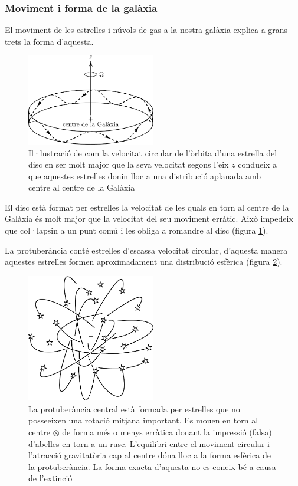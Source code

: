 \subsubsection*{Moviment i forma de la galàxia}
El moviment de les estrelles i núvols de gas a la nostra galàxia explica a grans trets la forma d'aquesta.
\begin{figure}[H]
	\centering
	\includegraphics[width=0.5\textwidth]{./images/6-vel-disc}
	\caption{Il·lustració de com la velocitat circular de l'òrbita d'una estrella del disc en ser molt major que la seva velocitat segons l'eix $z$ condueix a que aquestes estrelles donin lloc a una distribució aplanada amb centre al centre de la Galàxia}
	\label{fig:vel-disc}
\end{figure}

El disc està format per estrelles la velocitat de les quals en torn al centre de la Galàxia és molt major que la velocitat del seu moviment erràtic. Això impedeix que col·lapsin a un punt comú i les obliga a romandre al disc (figura \ref{fig:vel-disc}).

La protuberància conté estrelles d'escassa velocitat circular, d'aquesta manera aquestes estrelles formen aproximadament una distribució esfèrica (figura \ref{fig:milky-protuberance}).
\begin{figure}[H]
	\centering
	\includegraphics[width=0.5\textwidth]{./images/6-milky-protuberance}
	\caption{La protuberància central està formada per estrelles que no posseeixen una rotació mitjana important. Es mouen en torn al centre $\otimes$ de forma més o menys erràtica donant la impressió (falsa) d'abelles en torn a un rusc. L'equilibri entre el moviment circular i l'atracció gravitatòria cap al centre dóna lloc a la forma esfèrica de la protuberància. La forma exacta d'aquesta no es coneix bé a causa de l'extinció}
	\label{fig:milky-protuberance}
\end{figure}

